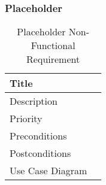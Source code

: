 \subsubsection{Placeholder}
  \begin{table}[h!]
    \caption{Placeholder Non-Functional Requirement}
    \label{evolutionary-requirements/non-functional-requirements/placeholder}
    \begin{tabularx}{\textwidth}{|l|X|}
      \hline
      Title            &  \\ \hline
      Description      &  \\ \hline
      Priority         &  \\ \hline
      Preconditions    &  \\ \hline
      Postconditions   & \\ \hline
      Use Case Diagram & \\ \hline
    \end{tabularx}
  \end{table}
